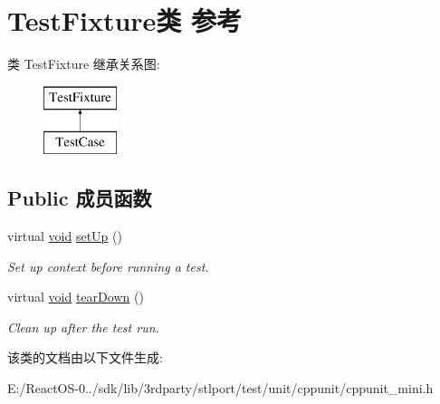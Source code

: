 \hypertarget{class_test_fixture}{}\section{Test\+Fixture类 参考}
\label{class_test_fixture}
类 Test\+Fixture 继承关系图\+:\begin{figure}[H]
\begin{center}
\leavevmode
\includegraphics[height=2.000000cm]{class_test_fixture}
\end{center}
\end{figure}
\subsection*{Public 成员函数}
\begin{DoxyCompactItemize}
\item 
\mbox{\label{class_test_fixture_a0e77590b14a3ec7f93fe02e5b89a242f}} 
virtual \hyperlink{interfacevoid}{void} \hyperlink{class_test_fixture_a0e77590b14a3ec7f93fe02e5b89a242f}{set\+Up} ()
\begin{DoxyCompactList}\small\item\em Set up context before running a test. \end{DoxyCompactList}\item 
\mbox{\label{class_test_fixture_a707dd4d7d0910af916343d79c0feffc9}} 
virtual \hyperlink{interfacevoid}{void} \hyperlink{class_test_fixture_a707dd4d7d0910af916343d79c0feffc9}{tear\+Down} ()
\begin{DoxyCompactList}\small\item\em Clean up after the test run. \end{DoxyCompactList}\end{DoxyCompactItemize}


该类的文档由以下文件生成\+:\begin{DoxyCompactItemize}
\item 
E\+:/\+React\+O\+S-\/0../sdk/lib/3rdparty/stlport/test/unit/cppunit/cppunit\+\_\+mini.\+h\end{DoxyCompactItemize}
